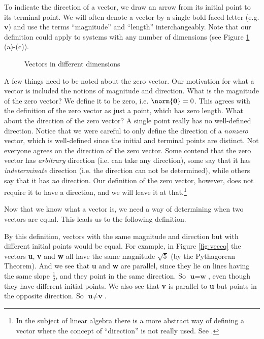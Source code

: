 To indicate the direction of a vector, we draw an arrow from its initial point to its terminal
point. We will often denote a vector by a single bold-faced letter (e.g. $\textbf{v}$) and use the terms
``magnitude'' and ``length'' interchangeably.
Note that our definition could apply to systems with any number of dimensions (see Figure \ref{fig:vecs}
(a)-(c)).

\begin{figure}[h]
 \centering
 \qquad
 \qquad
 \caption[]{\quad Vectors in different dimensions}
 \label{fig:vecs}
\end{figure}
\newpage
A few things need to be noted about the zero vector.
Our motivation for what a vector is included the notions of
magnitude and direction. What is the magnitude of the zero vector? We define it to be zero, i.e.
$\norm{\textbf{0}} = 0$.
This agrees with the definition of the zero vector as just a point, which has zero length.  What about the
direction of the zero vector?  A single point really has no well-defined direction.  Notice that we were careful
to only define the direction of a \emph{nonzero} vector, which is well-defined since the initial and
terminal points are distinct.
Not everyone agrees on the direction of the zero vector.  Some contend that the zero vector has \emph{arbitrary}
direction (i.e. can take any direction), some say that it has \emph{indeterminate} direction (i.e. the direction can
not be determined), while others say that it has \emph{no} direction. Our definition of the zero vector, however,
does not require it to have a direction, and we will leave it at that.\footnote{In the subject of linear algebra
there is a more abstract way of defining a vector where the concept of ``direction'' is not really used.
See \cite{ar}.}

Now that we know what a vector is, we need a way of determining when two vectors are equal.  This leads us to the
following definition.

By this definition, vectors with the same magnitude and direction but with different initial points would be
equal. For example, in Figure \ref{fig:veceq} the vectors \textbf{u}, \textbf{v} and \textbf{w} all have the same
magnitude $\sqrt 5$ (by the Pythagorean Theorem).  And we see that \textbf{u} and \textbf{w} are parallel, since they
lie on lines having the same slope $\frac{1}{2}$, and they point in the same direction. So $\textbf{u} = \textbf{w}$,
even though they have different initial points.  We also see that \textbf{v} is parallel to \textbf{u} but points in the
opposite direction. So $\textbf{u} \ne \textbf{v}$.

